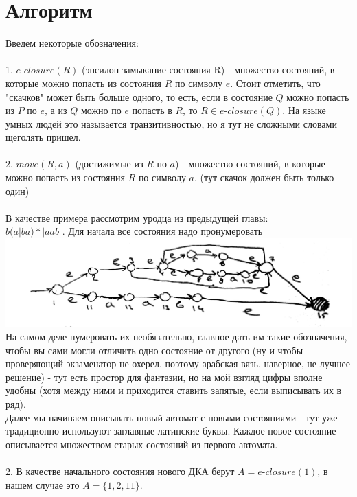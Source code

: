 \documentclass[14pt]{extreport}
\begin{document}
	\section*{Алгоритм}
	Введем некоторые обозначения:\\\\
	1. $e$-$closure(R)$ (эпсилон-замыкание состояния R) - множество состояний, в которые можно
	попасть из состояния $R$ по символу $e$. Стоит отметить, что "скачков"
	может быть больше одного,
	то есть, если в состояние $Q$ можно попасть из $P$ по $e$, а из $Q$ можно по $e$ попасть в $R$,
	то $R \in e$-$closure(Q)$. На языке умных людей это называется транзитивностью, но я тут не
	сложными словами щеголять пришел.\\\\
	2. $move(R, a)$ (достижимые из $R$ по $a$) - множество состояний, в которые можно попасть из
	состояния $R$ по символу $a$. (тут скачок должен быть только один)\\\\
	В качестве примера рассмотрим уродца из предыдущей главы:\\ $b(a|ba)*|aab$
	. Для начала все состояния надо пронумеровать\\
	\includegraphics[scale=0.13]{data/pic2_1.png}\\
	На самом деле нумеровать их необязательно, главное дать им такие обозначения, чтобы
	вы сами могли отличить одно состояние от другого (ну и чтобы проверяющий экзаменатор не
	охерел, поэтому арабская вязь, наверное, не лучшее решение) - тут есть простор для фантазии,
	но на мой взгляд цифры вполне удобны (хотя между ними и приходится ставить запятые,
	если выписывать их в ряд).\\
	Далее мы начинаем описывать новый автомат с новыми состояниями - тут уже традиционно
	используют заглавные латинские буквы. Каждое новое состояние описывается множеством 
	старых состояний из первого автомата.\\\\
	2. В качестве начального состояния нового ДКА берут $A=e$-$closure(1)$, в нашем случае
	это $A=\{1, 2, 11\}$.\\\\
\end{document}
